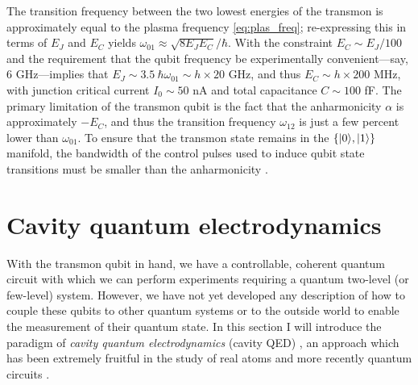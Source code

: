 The transition frequency between the two lowest energies of the transmon is approximately equal to the plasma frequency \eqref{eq:plas_freq}; re-expressing this in terms of $E_J$ and $E_C$ yields $\omega_{01} \approx \sqrt{8 E_J E_C}/\hbar$.  With the constraint $E_C \sim E_J/100$ and the requirement that the qubit frequency be experimentally convenient---say, 6 GHz---implies that $E_J \sim 3.5 \ \hbar \omega_{01} \sim h \times 20$ GHz, and thus $E_C \sim h \times 200$ MHz, with junction critical current $I_0 \sim 50$ nA and total capacitance $C \sim 100$ fF.  The primary limitation of the transmon qubit is the fact that the anharmonicity $\alpha$ is approximately $-E_C$, and thus the transition frequency $\omega_{12}$ is just a few percent lower than $\omega_{01}$.  To ensure that the transmon state remains in the $\{ |0\rangle,|1\rangle \}$ manifold, the bandwidth of the control pulses used to induce qubit state transitions must be smaller than the anharmonicity \cite{PhysRevA.82.040305}.

\section{Cavity quantum electrodynamics}

With the transmon qubit in hand, we have a controllable, coherent quantum circuit with which we can perform experiments requiring a quantum two-level (or few-level) system.  However, we have not yet developed any description of how to couple these qubits to other quantum systems or to the outside world to enable the measurement of their quantum state.  In this section I will introduce the paradigm of \textit{cavity quantum electrodynamics} (cavity QED) \cite{bermanbook}, an approach which has been extremely fruitful in the study of real atoms \cite{RevModPhys.73.565,0034-4885-69-5-R02} and more recently quantum circuits \cite{cQEDtheory,blai07}.

